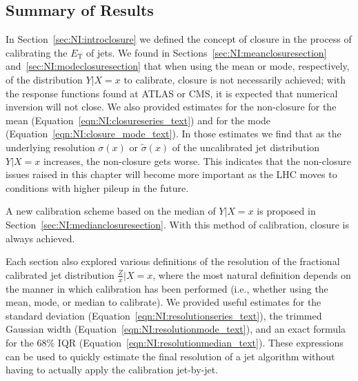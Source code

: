 \subsection{Summary of Results}
\label{sec:NI:summary}
In Section~\ref{sec:NI:introclosure} we defined the concept of closure in the process of calibrating the $E_\text{T}$ of jets.  We found in Sections~\ref{sec:NI:meanclosuresection} and~\ref{sec:NI:modeclosuresection} that when using the mean or mode, respectively, of the distribution $Y|X=x$ to calibrate, closure is not necessarily achieved; with the response functions found at ATLAS or CMS, it is expected that numerical inversion will not close. We also provided estimates for the non-closure for the mean (Equation~\ref{eqn:NI:closureseries_text}) and for the mode (Equation~\ref{eqn:NI:closure_mode_text}). In those estimates we find that as the underlying resolution $\sigma(x)$ or $\tilde{\sigma}(x)$ of the uncalibrated jet distribution $Y|X=x$ increases, the non-closure gets worse. This indicates that the non-closure issues raised in this chapter will become more important as the LHC moves to conditions with higher pileup in the future.

\vspace{2mm}

A new calibration scheme based on the median of $Y|X=x$ is proposed in Section~\ref{sec:NI:medianclosuresection}.  With this method of calibration, closure is always achieved.

\vspace{2mm}

Each section also explored various definitions of the resolution of the fractional calibrated jet distribution $\frac{Z}{x}|X=x$, where the most natural definition depends on the manner in which calibration has been performed (i.e., whether using the mean, mode, or median to calibrate). We provided useful estimates for the standard deviation (Equation~\ref{eqn:NI:resolutionseries_text}), the trimmed Gaussian width (Equation~\ref{eqn:NI:resolutionmode_text}), and an exact formula for the 68\% IQR (Equation~\ref{eqn:NI:resolutionmedian_text}). These expressions can be used to quickly estimate the final resolution of a jet algorithm without having to actually apply the calibration jet-by-jet.

